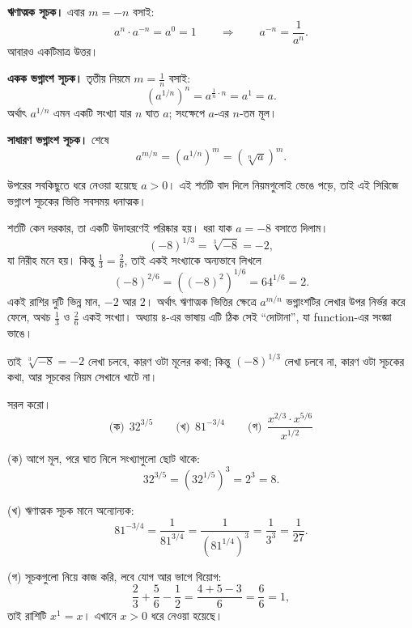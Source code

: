 \documentclass[11pt]{article}
\begin{document}
\textbf{ঋণাত্মক সূচক।} এবার $m = -n$ বসাই:
\[
  a^{n} \cdot a^{-n} = a^{0} = 1
  \qquad \Longrightarrow \qquad
  a^{-n} = \frac{1}{a^{n}} .
\]
আবারও একটিমাত্র উত্তর।

\textbf{একক ভগ্নাংশ সূচক।} তৃতীয় নিয়মে $m = \tfrac{1}{n}$ বসাই:
\[
  \left( a^{1/n} \right)^{n} = a^{\frac{1}{n} \cdot n} = a^{1} = a .
\]
অর্থাৎ $a^{1/n}$ এমন একটি সংখ্যা যার $n$ ঘাত $a$; সংক্ষেপে $a$-এর $n$-তম মূল।

\textbf{সাধারণ ভগ্নাংশ সূচক।} শেষে
\[
  a^{m/n} = \left( a^{1/n} \right)^{m} = \left( \sqrt[n]{a} \right)^{m} .
\]

\begin{idea}[ভিত্তি ধনাত্মক রাখতে হবে]
উপরের সবকিছুতে ধরে নেওয়া হয়েছে $a > 0$। এই শর্তটি বাদ দিলে নিয়মগুলোই ভেঙে
পড়ে, তাই এই সিরিজে ভগ্নাংশ সূচকের ভিত্তি সবসময় ধনাত্মক।
\end{idea}

\begin{remark}
শর্তটি কেন দরকার, তা একটি উদাহরণেই পরিষ্কার হয়। ধরা যাক $a = -8$ বসাতে দিলাম।
\[
  (-8)^{1/3} = \sqrt[3]{-8} = -2 ,
\]
যা নিরীহ মনে হয়। কিন্তু $\tfrac{1}{3} = \tfrac{2}{6}$, তাই একই সংখ্যাকে অন্যভাবে
লিখলে
\[
  (-8)^{2/6} = \left( (-8)^{2} \right)^{1/6} = 64^{1/6} = 2 .
\]
একই রাশির দুটি ভিন্ন মান, $-2$ আর $2$। অর্থাৎ ঋণাত্মক ভিত্তির ক্ষেত্রে
$a^{m/n}$ ভগ্নাংশটির লেখার উপর নির্ভর করে ফেলে, অথচ $\tfrac{1}{3}$ ও
$\tfrac{2}{6}$ একই সংখ্যা। অধ্যায় ৪-এর ভাষায় এটি ঠিক সেই ``দোটানা'', যা
function-এর সংজ্ঞা ভাঙে।

তাই $\sqrt[3]{-8} = -2$ লেখা চলবে, কারণ ওটা মূলের কথা; কিন্তু $(-8)^{1/3}$
লেখা চলবে না, কারণ ওটা সূচকের কথা, আর সূচকের নিয়ম সেখানে খাটে না।
\end{remark}

\begin{example}
সরল করো।
\[
  \text{(ক)}\ \ 32^{3/5}
  \qquad
  \text{(খ)}\ \ 81^{-3/4}
  \qquad
  \text{(গ)}\ \ \frac{x^{2/3} \cdot x^{5/6}}{x^{1/2}}
\]
\end{example}

\begin{solbox}
(ক) আগে মূল, পরে ঘাত নিলে সংখ্যাগুলো ছোট থাকে:
\[
  32^{3/5} = \left( 32^{1/5} \right)^{3} = 2^{3} = 8 .
\]

(খ) ঋণাত্মক সূচক মানে অন্যোন্যক:
\[
  81^{-3/4} = \frac{1}{81^{3/4}}
            = \frac{1}{\left( 81^{1/4} \right)^{3}}
            = \frac{1}{3^{3}} = \frac{1}{27} .
\]

(গ) সূচকগুলো নিয়ে কাজ করি, লবে যোগ আর ভাগে বিয়োগ:
\[
  \frac{2}{3} + \frac{5}{6} - \frac{1}{2}
  = \frac{4 + 5 - 3}{6} = \frac{6}{6} = 1 ,
\]
তাই রাশিটি $x^{1} = x$। এখানে $x > 0$ ধরে নেওয়া হয়েছে।
\end{solbox}
\end{document}
